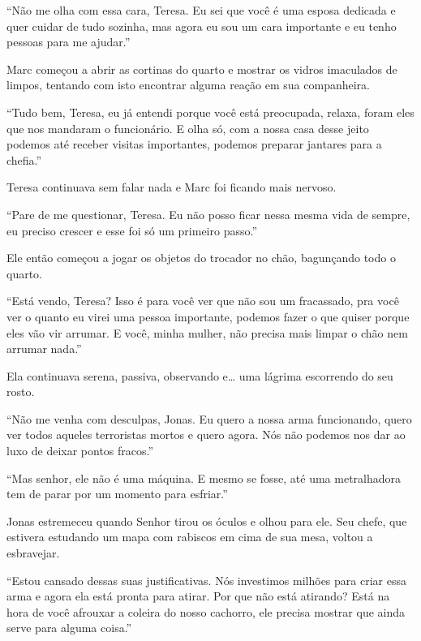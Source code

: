 ``Não me olha com essa cara, Teresa. Eu sei que você é uma esposa
dedicada e quer cuidar de tudo sozinha, mas agora eu sou um cara
importante e eu tenho pessoas para me ajudar.''

Marc começou a abrir as cortinas do quarto e mostrar os vidros
imaculados de limpos, tentando com isto encontrar alguma reação em sua
companheira.

``Tudo bem, Teresa, eu já entendi porque você está preocupada, relaxa,
foram eles que nos mandaram o funcionário. E olha só, com a nossa casa
desse jeito podemos até receber visitas importantes, podemos preparar
jantares para a chefia.''

Teresa continuava sem falar nada e Marc foi ficando mais nervoso.

``Pare de me questionar, Teresa. Eu não posso ficar nessa mesma vida de
sempre, eu preciso crescer e esse foi só um primeiro passo.''

Ele então começou a jogar os objetos do trocador no chão, bagunçando
todo o quarto.

``Está vendo, Teresa? Isso é para você ver que não sou um fracassado,
pra você ver o quanto eu virei uma pessoa importante, podemos fazer o
que quiser porque eles vão vir arrumar. E você, minha mulher, não
precisa mais limpar o chão nem arrumar nada.''

Ela continuava serena, passiva, observando e\ldots{} uma lágrima
escorrendo do seu rosto.

\asterisc


``Não me venha com desculpas, Jonas. Eu quero a nossa arma funcionando,
quero ver todos aqueles terroristas mortos e quero agora. Nós não
podemos nos dar ao luxo de deixar pontos fracos.''

``Mas senhor, ele não é uma máquina. E mesmo se fosse, até uma
metralhadora tem de parar por um momento para esfriar.''

Jonas estremeceu quando Senhor  tirou os óculos e olhou para ele. Seu
chefe, que estivera estudando um mapa com rabiscos em cima de sua mesa,
voltou a esbravejar.

``Estou cansado dessas suas justificativas. Nós investimos milhões para
criar essa arma e agora ela está pronta para atirar. Por que não está
atirando? Está na hora de você afrouxar a coleira do nosso cachorro, ele
precisa mostrar que ainda serve para alguma coisa.''


